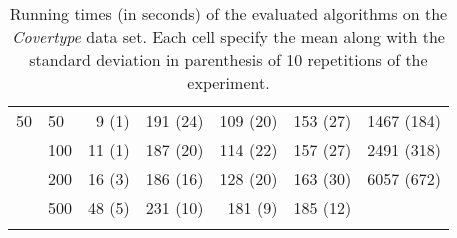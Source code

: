 \begin{longtable}{llrrrrr}
 \midrule
50 & 50  &   9 (1) &       191 (24) &  109 (20) &             153 (27) &  1467 (184) \\
   & 100 &  11 (1) &       187 (20) &  114 (22) &             157 (27) &  2491 (318) \\
   & 200 &  16 (3) &       186 (16) &  128 (20) &             163 (30) &  6057 (672) \\
   & 500 &  48 (5) &       231 (10) &   181 (9) &             185 (12) &          \\
\bottomrule
\caption{Running times (in seconds) of the evaluated algorithms on the \textit{Covertype} data set. Each cell specify the mean along with the standard deviation in parenthesis of 10 repetitions of the experiment.}
\label{tab:running-time-mean-covertype}
\end{longtable}

